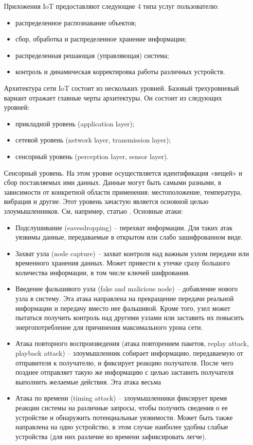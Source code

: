 Приложения IoT предоставляют следующие 4 типа услуг пользователю:
\begin{itemize}
	\item распределенное распознавание объектов;
	\item сбор, обработка и распределенное хранение информации;
	\item распределенная решающая (управляющая) система;
	\item контроль и динамическая корректировка работы различных устройств.
\end{itemize}

Архитектура сети IoT состоит из нескольких уровней. Базовый трехуровневый вариант отражает главные черты архитектуры. Он состоит из следующих уровней:
\begin{itemize}
	\item прикладной уровень (application layer);
	\item сетевой уровень (network layer, transmission layer);
	\item сенсорный уровень (perception layer, sensor layer). 	
\end{itemize}

Сенсорный уровень. На этом уровне осуществляется идентификация «вещей» и сбор поставляемых ими данных. Данные могут быть самыми разными, в зависимости от конкретной области применения: местоположение, температура, вибрация и другие. Этот уровень зачастую является основной целью злоумышленников. См, например, статью \cite{src21}. Основные атаки:
\begin{itemize}
	\item Подслушивание (eavesdropping) – перехват информации. Для таких атак уязвимы данные, передаваемые в открытом или слабо зашифрованном виде.
	\item Захват узла (node capture) – захват контроля над важным узлом передачи или временного хранения данных. Может привести к утечке сразу большого количества информации, в том числе ключей шифрования.
	\item Введение фальшивого узла (fake and malicious node) – добавление нового узла в систему. Эта атака направлена на прекращение передачи реальной информации и передачу вместо нее фальшивой. Кроме того, узел может пытаться получить контроль над другими узлами или заставить их повысить энергопотребление для причинения максимального урона сети.
	\item Атака повторного воспроизведения (атака повторением пакетов, replay attack, playback attack) – злоумышленник собирает информацию, передаваемую от отправителя к получателю, и фиксирует реакцию получателя. После чего позднее отправляет такую же информацию с целью заставить получателя выполнить желаемые действия. Эта атака весьма
	\item Атака по времени (timing attack) – злоумышленники фиксирует время реакции системы на различные запросы, чтобы получить сведения о ее устройстве и обнаружить потенциальные уязвимости. Может быть также направлена на одно устройство, в этом случае наиболее удобны слабые устройства (для них различие во времени зафиксировать легче).
\end{itemize}

